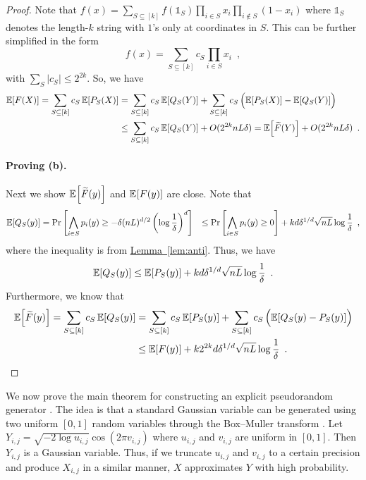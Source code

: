 \documentclass[12pt]{article}
\newcommand{\lem}[1]{\hyperref[lem:#1]{Lemma~\ref*{lem:#1}}}
\newcommand{\br}[1]{\left(#1\right)} \newcommand{\Br}[1]{\left[#1\right]} \newcommand{\st}[1]{\left\{#1\right\}} \newcommand{\tr}[1]{\mathrm{Tr}\!\Br{#1}} \newcommand{\abs}[1]{\left|#1 \right|} \newcommand{\norm}[1]{\left\lVert #1 \right\rVert} \newcommand{\agl}[2]{\theta^{\br{#1}}_{#2}} \newcommand{\aglp}[2]{{\theta'}^{\br{#1}}_{#2}} \newcommand{\lint}[1]{\left\lfloor#1\right\rfloor} \newcommand{\poly}[1]{\mathrm{poly}\!\br{#1}} \newcommand{\negl}[1]{\mathrm{negl}\!\br{#1}} \newcommand{\de}[1]{\mathrm{d}#1} \newcommand{\val}[1]{\mathrm{val}\!\br{#1}} \newcommand{\vall}[1]{\mathrm{val}\br{#1}} \newcommand{\nd}[1]{\mathcal{N}\!\br{#1}} \newcommand{\ketbratwo}[2]{\ket{#1} \hspace{-0.4em}\bra{#2}} \newcommand{\ketbra}[1]{\ketbratwo{#1}{#1}} \newcommand{\id}{\ensuremath{\mathds{1}}} \newcommand{\ogroup}[1]{\mathrm{O}\!\br{#1}} \newcommand{\ugroup}[1]{\mathrm{U}\!\br{#1}} \newcommand{\td}{\mathrm{TD}} \newcommand{\tv}[1]{\norm{#1}_{\mathrm{TV}}} \newcommand {\defeq} {\ensuremath{ \stackrel{\mathrm{def}}{=} }} \newcommand{\vdim}{\ensuremath{N}} \newcommand{\dimin}{\ensuremath{n}} \newcommand{\dimout}{\ensuremath{m}} \newcommand{\ncopy}{\ell} \newcommand{\hspacein}{\H_\mathrm{in}} \newcommand{\hspaceout}{\H_\mathrm{out}} \newcommand{\Sin}{\S(\hspacein)} \newcommand{\Sout}{\S(\hspaceout)} \newcommand{\haar}{\ensuremath{\mu}} \newcommand{\tensorhaar}{\ensuremath{\eta}} \newcommand{\tensorsrss}{\ensuremath{\nu}} \newcommand{\qadvice}{\ensuremath{\rho}} \newcommand{\tp}{\otimes} \newcommand{\wone}[2]{W_1\!\br{#1,#2}}
\begin{document}
\begin{proof}
	Note that $f(x) = \sum_{S\subseteq [k] } f(\id_S) \prod_{i\in S} x_i \prod_{i\notin S}(1-x_i) $ where $\id_S$ denotes the length-$k$ string with $1$'s only at coordinates in $S$. This can be further simplified in the form
	\[
		f(x) = \sum_{S\subseteq [k] } c_S \prod_{i\in S} x_i \enspace,
	\]
	with $\sum_S \abs{c_S} \leq 2^{2k}$. So, we have
	\begin{align*}
		\expect{}{
			F(X)	
		}  = 
		\sum_{S\subseteq [k] } c_S \expect{}{
			P_S(X)	
		}
		&=
		\sum_{S\subseteq [k] } c_S \expect{}{
		 	Q_S(Y)	
		}
		+ \sum_{S\subseteq [k] } c_S \br{\expect{}{
			P_S(X)	
		} - \expect{}{
		 	Q_S(Y)	
		}}\\
		&\leq \sum_{S\subseteq [k] } c_S \expect{}{
		 	Q_S(Y)	
		} + O(2^{2k}nL\delta) 
		= \expect{}{
			\widetilde{F}(Y)	
		}+ O(2^{2k}nL\delta)\enspace.
	\end{align*}
\vspace{-1em}
	\paragraph{Proving (b).}
	Next we show $\expect{}{
			\widetilde{F}(y)	
		}$ and $\expect{}{
			F(y)	
		}$ are close.
	Note that
	\begin{align*}
		\expect{}{
			Q_S(y)	 
		} &= \Pr \Br{ \bigwedge_{i\in S} p_i(y)\geq -\delta (nL)^{d/2} \br{\log\frac{1}{\delta}}^{d} }
		&\leq \Pr \Br{ \bigwedge_{i\in S} p_i(y)\geq 0 } + k d \delta^{1/d} \sqrt{nL} \log\frac{1}{\delta}\enspace,
	\end{align*}
	where the inequality is from \lem{anti}.
	Thus, we have
	\[
		\expect{}{
			Q_S(y)	 
		} \leq \expect{}{
			P_S(y)	 
		} + k d \delta^{1/d} \sqrt{nL} \log\frac{1}{\delta}	\enspace .
	\]
	Furthermore, we know that
	\begin{align*}
		\expect{}{
			\widetilde{F}(y)	
		}
		= \sum_{S\subseteq [k] } c_S \expect{}{
		 	Q_S(y)	
		}&= \sum_{S\subseteq [k] } c_S \expect{}{
		 	P_S(y)	
		} + \sum_{S\subseteq [k] } c_S \br{\expect{}{
		 	Q_S(y) - P_S(y)	
		}}\\
		&\leq \expect{}{
			F(y)	
		} + k2^{2k} d \delta^{1/d} \sqrt{nL} \log\frac{1}{\delta} \enspace .
	\end{align*}
	
\end{proof}




We now prove the main theorem for constructing an explicit pseudorandom generator .
The idea is that a standard Gaussian variable can be generated using two uniform $[0,1]$ random variables
through the Box–Muller transform \cite{Bm58}.
Let
$
	Y_{i,j} = \sqrt{-2 \log u_{i,j}}\cos(2\pi v_{i,j})
$ 
where $u_{i,j}$ and $v_{i,j}$ are uniform in $[0,1]$. Then $Y_{i,j}$ is a Gaussian variable.
Thus, if we truncate $u_{i,j}$ and $v_{i,j}$ to a certain precision and produce $X_{i,j}$ in a similar manner, $X$ approximates $Y$ with high probability.
\end{document}
